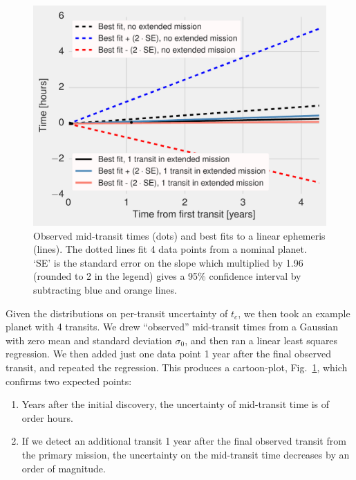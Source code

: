 \begin{figure}[!t]
	\centering
	\includegraphics[scale=1.]{figures/lowering_uncertainty_on_midtransit_via_extra_point.pdf}
	\caption{	Observed mid-transit times (dots) and best fits to a linear ephemeris (lines).
		The dotted lines fit 4 data points from a nominal planet.
		`SE' is the standard error on the slope which multiplied by 1.96 (rounded to 2 in the legend) gives a 95\% confidence interval by subtracting blue and orange lines.
	}
	\label{fig:lowering_uncertainty_tc}
\end{figure}

Given the distributions on per-transit uncertainty of $t_c$, we then took an example planet with 4 transits.
We drew ``observed'' mid-transit times from a Gaussian with zero mean and standard deviation $\sigma_{0}$, and then ran a linear least squares regression. 
We then added just one data point 1 year after the final observed transit, and repeated the regression.
This produces a cartoon-plot, Fig.~\ref{fig:lowering_uncertainty_tc}, which confirms two expected points:
\begin{enumerate}
	\item Years after the initial discovery, the uncertainty of mid-transit time is of order hours.
	\item If we detect an additional transit 1 year after the final observed transit from the primary mission, the uncertainty on the mid-transit time decreases by an order of magnitude.
\end{enumerate}

